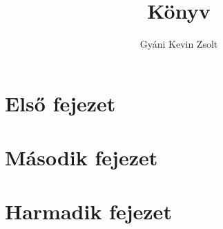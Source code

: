 \documentclass{book}
\begin{document}
    \frontmatter
        \title{Könyv}
        \author{Gyáni Kevin Zsolt}
        \maketitle
    
        \tableofcontents
    
    \mainmatter
        \chapter{Első fejezet}
            \cite{abrharber03}
            \lipsum[2-7]
            \cite{knuth84}
        \chapter{Második fejezet}
            \lipsum[3-5]
        \chapter{Harmadik fejezet}
            \lipsum[1]
            \cite{g4gbin}
            \lipsum[8]
            
    \backmatter
        
        
    
\end{document}
